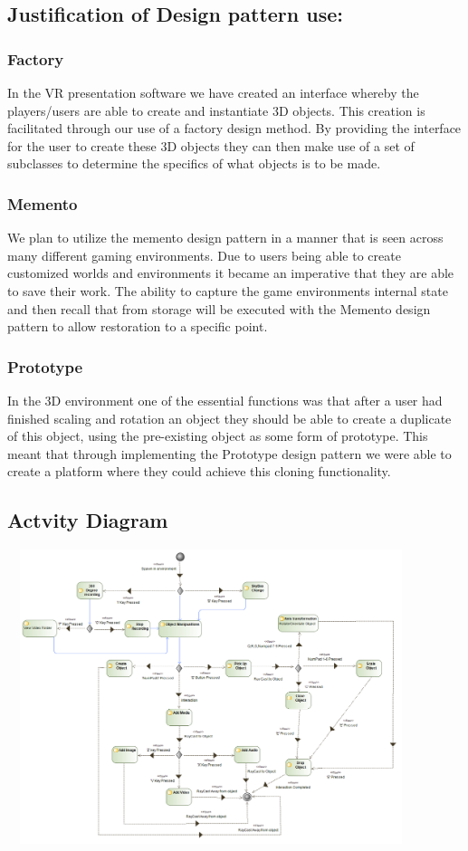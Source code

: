 \documentclass{article}
\begin{document}
  	\subsection{Justification of Design pattern use:}
  	\subsubsection{Factory}
  	In the VR presentation software we have created an interface whereby the players/users are able to create and instantiate 3D objects. This creation is facilitated through our use of a factory design method. By providing the interface for the user to create these 3D objects they can then make use of a set of subclasses to determine the specifics of what objects is to be made.\\
  	\subsubsection{Memento}
  	We plan to utilize the memento design pattern in a manner that is seen across many different gaming environments. Due to users being able to create customized worlds and environments it became an imperative that they are able to save their work. The ability to capture the game environments internal state and then recall that from storage will be executed with the Memento design pattern to allow restoration to a specific point.\\
  	\subsubsection{Prototype}
  	In the 3D environment one of the essential functions was that after a user had finished scaling and rotation an object they should be able to create a duplicate of this object, using the pre-existing object as some form of prototype. This meant that through implementing the Prototype design pattern we were able to create a platform where they could achieve this cloning functionality.
    \subsection{Actvity Diagram}
  	\includegraphics[width=450px,height=325px]{ActivityDiagram.png}
\end{document}
